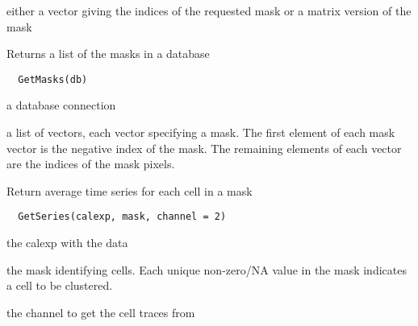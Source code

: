 \documentclass[a4paper]{book}
\begin{document}
%
\begin{Value}
either a vector giving the indices of the requested mask
or a matrix version of the mask
\end{Value}
%
\begin{Description}\relax
Returns a list of the masks in a database
\end{Description}
%
\begin{Usage}
\begin{verbatim}
  GetMasks(db)
\end{verbatim}
\end{Usage}
%
\begin{Arguments}
\begin{ldescription}
\item[\code{db}] a database connection
\end{ldescription}
\end{Arguments}
%
\begin{Value}
a list of vectors, each vector specifying a mask.  The
first element of each mask vector is the negative index
of the mask.  The remaining elements of each vector are
the indices of the mask pixels.
\end{Value}
%
\begin{Description}\relax
Return average time series for each cell in a mask
\end{Description}
%
\begin{Usage}
\begin{verbatim}
  GetSeries(calexp, mask, channel = 2)
\end{verbatim}
\end{Usage}
%
\begin{Arguments}
\begin{ldescription}
\item[\code{calexp}] the calexp with the data

\item[\code{mask}] the mask identifying cells.  Each unique
non-zero/NA value in the mask indicates a cell to be
clustered.

\item[\code{channel}] the channel to get the cell traces from
\end{ldescription}
\end{Arguments}
\end{document}
